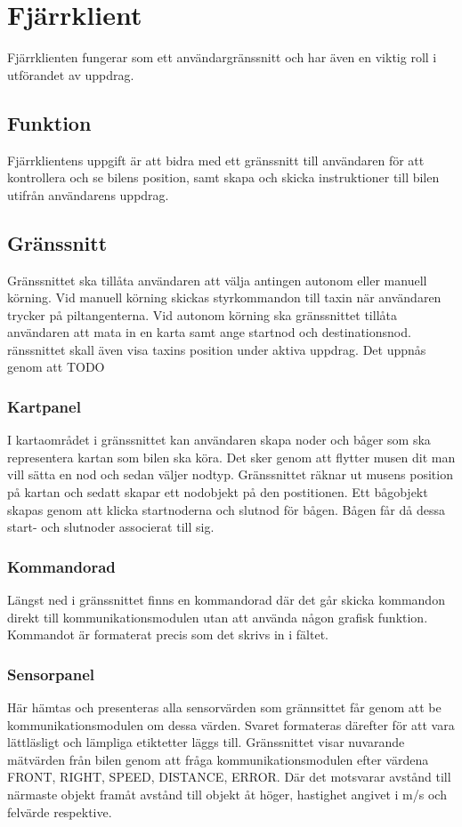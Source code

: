 \documentclass[tekniskrapport/tech.tex]{subfiles}
\begin{document}
\section{Fjärrklient}
Fjärrklienten fungerar som ett användargränssnitt och har även en
viktig roll i utförandet av uppdrag.

\subsection{Funktion}
Fjärrklientens uppgift är att bidra med ett gränssnitt till användaren för att
kontrollera och se bilens position, samt skapa och skicka instruktioner till bilen
utifrån användarens uppdrag.

\subsection{Gränssnitt}
Gränssnittet ska tillåta användaren att välja antingen autonom eller manuell
körning. Vid manuell körning skickas styrkommandon till taxin när användaren
trycker på piltangenterna. Vid autonom körning ska gränssnittet tillåta
användaren att mata in en karta samt ange startnod och destinationsnod.
ränssnittet skall även visa taxins position under aktiva uppdrag. Det uppnås genom att TODO

\subsubsection{Kartpanel}
I kartaområdet i gränssnittet kan användaren skapa noder och båger som ska
representera kartan som bilen ska köra. Det sker genom att flytter musen dit
man vill sätta en nod och sedan väljer nodtyp. Gränssnittet räknar
ut musens position på kartan och sedatt skapar ett nodobjekt på den postitionen.
Ett bågobjekt skapas genom att klicka startnoderna och slutnod för bågen.
Bågen får då dessa start- och slutnoder associerat till sig.

\subsubsection{Kommandorad}
Längst ned i gränssnittet finns en kommandorad där det går skicka kommandon
direkt till kommunikationsmodulen utan att använda någon grafisk funktion.
Kommandot är formaterat precis som det skrivs in i fältet.

\subsubsection{Sensorpanel}
Här hämtas och presenteras alla sensorvärden som grännsittet får genom att be
kommunikationsmodulen om dessa värden. Svaret formateras därefter för att vara
lättläsligt och lämpliga etiktetter läggs till.  Gränssnittet visar nuvarande
mätvärden från bilen genom att fråga kommunikationsmodulen efter värdena FRONT,
RIGHT, SPEED, DISTANCE, ERROR. Där det motsvarar avstånd till närmaste objekt
framåt avstånd till objekt åt höger, hastighet angivet i m/s och felvärde
respektive. 
\end{document}
